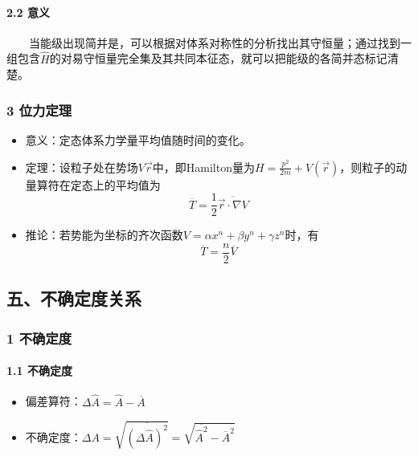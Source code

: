 \documentclass[UTF8,twocolumn]{ctexart}
\providecommand{\tightlist}{%
  \setlength{\itemsep}{0pt}\setlength{\parskip}{0pt}}
\let\oldparagraph\paragraph
\renewcommand{\paragraph}[1]{\oldparagraph{#1}\mbox{}}
\begin{document}
\hypertarget{ux610fux4e49}{%
\paragraph{ 2.2 意义}\label{ux610fux4e49}}

  当能级出现简并是，可以根据对体系对称性的分析找出其守恒量；通过找到一组包含\(\hat{H}\)的对易守恒量完全集及其共同本征态，就可以把能级的各简并态标记清楚。

\hypertarget{ux4f4dux529bux5b9aux7406}{%
\subsubsection{3 位力定理}\label{ux4f4dux529bux5b9aux7406}}

\begin{itemize}
\tightlist
\item
  意义：定态体系力学量平均值随时间的变化。
\item
  定理：设粒子处在势场\(V{\vec{r}}\)中，即Hamilton量为\(H=\frac{p^2}{2m}+V(\vec{r})\)，则粒子的动量算符在定态上的平均值为
  \[\overline{T}=\frac{1}{2}\overline{\vec{r}\cdot\nabla V}\]
\item
  推论：若势能为坐标的齐次函数\(V=\alpha x^n+\beta y^n+\gamma z^n\)时，有
  \[\overline{T}=\frac{n}{2}\overline{V}\]
\end{itemize}

\hypertarget{ux4e94ux4e0dux786eux5b9aux5ea6ux5173ux7cfb}{%
\subsection{五、不确定度关系}\label{ux4e94ux4e0dux786eux5b9aux5ea6ux5173ux7cfb}}

\hypertarget{ux4e0dux786eux5b9aux5ea6}{%
\subsubsection{1 不确定度}\label{ux4e0dux786eux5b9aux5ea6}}

\hypertarget{ux4e0dux786eux5b9aux5ea6-1}{%
\paragraph{ 1.1 不确定度}\label{ux4e0dux786eux5b9aux5ea6-1}}

\begin{itemize}
\tightlist
\item
  偏差算符：\(\Delta\hat{A}=\hat{A}-\overline{A}\)
\item
  不确定度：\(\Delta A=\sqrt{\overline{(\Delta\hat{A})^2}}=\sqrt{\overline{\hat{A}^2}-\overline{A}^2}\)
\end{itemize}
\end{document}
